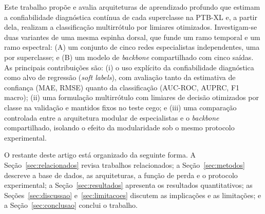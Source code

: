 Este trabalho propõe e avalia arquiteturas de aprendizado profundo que
estimam a confiabilidade diagnóstica contínua de cada superclasse na PTB-XL
e, a partir dela, realizam a classificação multirrótulo por limiares
otimizados. Investigam-se duas variantes de uma mesma espinha dorsal, que
funde um ramo temporal e um ramo espectral: (A) um conjunto de cinco redes
especialistas independentes, uma por superclasse; e (B) um modelo de
\textit{backbone} compartilhado com cinco saídas. As principais
contribuições são: (i) o uso explícito da confiabilidade diagnóstica como
alvo de regressão (\textit{soft labels}), com avaliação tanto da estimativa
de confiança (MAE, RMSE) quanto da classificação (AUC-ROC, AUPRC, F1
macro); (ii) uma formulação multirrótulo com limiares de decisão otimizados
por classe na validação e mantidos fixos no teste cego; e (iii) uma
comparação controlada entre a arquitetura modular de especialistas e o
\textit{backbone} compartilhado, isolando o efeito da modularidade sob o
mesmo protocolo experimental.

O restante deste artigo está organizado da seguinte forma. A
Seção~\ref{sec:relacionados} revisa trabalhos relacionados; a
Seção~\ref{sec:metodos} descreve a base de dados, as arquiteturas, a função
de perda e o protocolo experimental; a Seção~\ref{sec:resultados} apresenta
os resultados quantitativos; as Seções~\ref{sec:discussao}
e~\ref{sec:limitacoes} discutem as implicações e as limitações; e a
Seção~\ref{sec:conclusao} conclui o trabalho.

